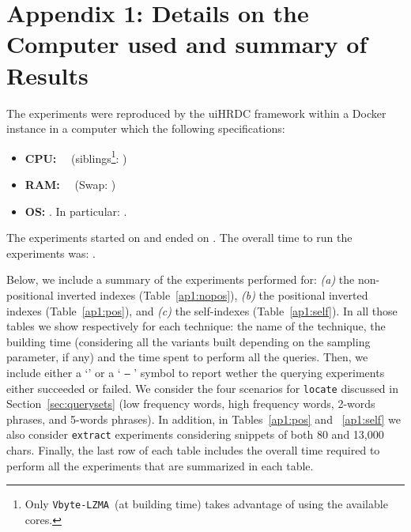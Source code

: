 \documentclass[review]{elsarticle}
\newcommand{\vbyteLZMA}{\texttt{Vbyte-LZMA}}
\begin{document}

\section{Appendix 1: Details on the Computer used and summary of Results}
\newcommand{\ok}{\checkmark}
\newcommand{\ko}{  \texttt{--} }        
               


The experiments were reproduced by the uiHRDC framework within a Docker instance in a computer which the following specifications:
\begin{itemize}
\item {\bf CPU:} \cpu  ~~(siblings\footnote{Only \vbyteLZMA\ (at building time) takes advantage of using the available cores.}: \nsiblings)
\item {\bf RAM:} \mem  ~~(Swap: \swapmem)
\item {\bf OS:} \osversion. In particular: \osfull.
\end{itemize}
The experiments started on {\em \runinidate} and ended on {\em \runenddate}. The overall time to run the experiments was: {\bf \elapsed}.

\medskip

Below, we include a summary of the experiments performed for: 
{\em (a)} the non-positional inverted indexes (Table~\ref{ap1:nopos}),
{\em (b)} the positional inverted indexes (Table~\ref{ap1:pos}), and 
{\em (c)} the self-indexes (Table~\ref{ap1:self}). In all those tables we show respectively for each technique: 
the name of the technique, the building time (considering all the variants built depending on the sampling parameter, if any) and the time spent to perform all the queries.
Then, we include either a `\ok' or a `\ko' symbol to report wether the querying experiments either succeeded or failed. We consider the four scenarios for \texttt{locate} discussed in Section~\ref{sec:querysets}
(low frequency words, high frequency words, 2-words phrases, and 5-words phrases). In addition, in Tables~\ref{ap1:pos} and ~\ref{ap1:self} we also consider \texttt{extract} experiments considering snippets of both 80 and 13,000 chars. 
Finally, the last row of each table includes the overall time required to perform all the experiments that are summarized in each table.






%


\end{document}
